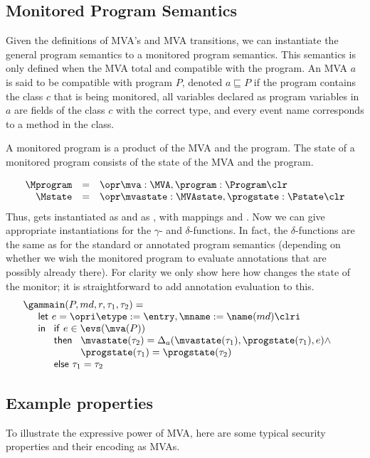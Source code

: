 \subsection{Monitored Program Semantics}
Given the definitions of MVA's and MVA transitions, we can instantiate
the general program semantics to a monitored program semantics. This
semantics is only defined when the MVA total and compatible with the
program. An MVA \(a\) is said to be compatible with program \(P\),
denoted \(a \sqsubseteq P\) if the program contains the class \(c\) that is
being monitored, all variables declared as program variables in
\(a\) are fields of the class \(c\) with the correct type, and every
event name corresponds to a method in the class. 

A monitored program is a product of the MVA and the program.
The state of a monitored program consists of the state of the MVA and
the program.

\[ 
\begin{array}{rcl}
\Mprogram & =  & \opr \mva : \MVA, \program : \Program \clr\\
\Mstate & = & \opr \mvastate : \MVAstate, \progstate : \Pstate \clr
\end{array}
\]
Thus, \FullProgram gets instantiated as \Mprogram and \FullState as
\Mstate, with mappings \program and \progstate. Now we can give
appropriate instantiations for the \(\gamma\)- and
\(\delta\)-functions. In fact, the \(\delta\)-functions are the same as
for the standard or annotated program semantics (depending on whether
we wish the monitored program to evaluate annotations that are
possibly already there). For clarity we only show here how \gammain
changes the state of the monitor; it is straightforward to add 
annotation evaluation to this. 
\[
\begin{array}{l}
\gammain(P, md, r, \tau_1, \tau_2) = \\
\quad
\begin{array}[t]{l}
\mathsf{let\ } e = \opri \etype := \entry, \mname := \name(md) \clri \\
\mathsf{in\ }
\begin{array}[t]{l}
\mathsf{if\ }  e \in \evs(\mva(P)) \\
\mathsf{then\ }\begin{array}[t]{l}
       \mvastate(\tau_2) = \Delta_a(\mvastate(\tau_1),
\progstate(\tau_1), e) \wedge \\
      \progstate(\tau_1) = \progstate(\tau_2)
      \end{array}\\
\mathsf{else\ } \tau_1 = \tau_2
\end{array}
\end{array}
\end{array}
\]

\subsection{Example properties}
To illustrate the expressive power of MVA, here are some typical
security properties and their encoding as MVAs. 


